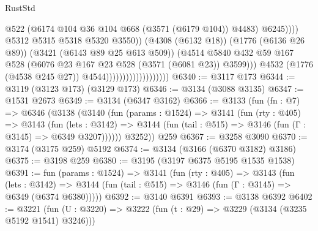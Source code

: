 \begin{lexlean}{RustStd}
\begin{coremodule}
                                                        @522
                                                        (@6174
                                                          @104
                                                          @36
                                                          @104
                                                          @668
                                                          (@3571 (@6179 @104))
                                                          @4483)
                                                        @6245))))
                                                @5312
                                                @5315
                                                @5318
                                                @5320
                                                @3550))
                                            (@4308 (@6132 @18))
                                            (@1776 (@6136 @26 @89))
                                            (@3421 (@6143 @89 @25 @613 @509))
                                            (@4514
                                              @5840
                                              @432
                                              @59
                                              @167
                                              @528
                                              (@6076 @23 @167 @23 @528 (@3571 (@6081 @23)) @3599)))
                                          @4532
                                          (@1776 (@4538 @245 @27))
                                          @4544)))))))))))))))))))
@6340 := @3117 @173
@6344 := @3119 (@3123 @173) (@3129 @173)
@6346 := @3134 (@3088 @3135)
@6347 := @1531 @2673
@6349 := @3134 (@6347 @3162)
@6366 := @3133
    (fun (fn : @7) =>
    @6346
      (@3138
        (@3140
          (fun (params : @1524) =>
          @3141
            (fun (rty : @405) =>
            @3143
              (fun (lets : @3142) =>
              @3144 (fun (tail : @515) => @3146 (fun (Γ : @3145) => @6349 @3207))))))
        @3252))
    @259
@6367 := @3258 @3090
@6370 := @3174 (@3175 @259) @5192
@6374 := @3134 (@3166 (@6370 @3182) @3186)
@6375 := @3198 @259
@6380 := @3195 (@3197 @6375 @5195 @1535 @1538)
@6391 := fun (params : @1524) =>
  @3141
    (fun (rty : @405) =>
    @3143
      (fun (lets : @3142) =>
      @3144 (fun (tail : @515) => @3146 (fun (Γ : @3145) => @6349 (@6374 @6380)))))
@6392 := @3140 @6391
@6393 := @3138 @6392
@6402 := @3221 (fun (U : @3220) => @3222 (fun (t : @29) => @3229 (@3134 (@3235 @5192 @1541) @3246)))

\end{coremodule}
\end{lexlean}
